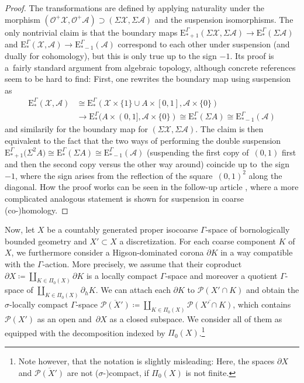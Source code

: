 \documentclass[pdftex]{sigma}
\numberwithin{equation}{section}
\theoremstyle{definition}
\newcommand{\cO}{\mathcal{O}}
\newcommand{\cP}{\mathcal{P}}
\newcommand{\cX}{\mathcal{X}}
\newcommand{\cA}{\mathcal{A}}
\newcommand{\Homol}{\mathrm{E}}
\newcommand{\coarsecomp}{\Pi_0}
\begin{document}
\begin{proof}
{\sloppy The transformations are defined by applying naturality under the morphism $(\cO^+\cX,\cO^+\cA)\allowbreak\supset (\Sigma\cX,\Sigma\cA)$ and the suspension isomorphisms. The only nontrivial claim is that the boundary maps $\Homol^\Gamma_{*+1}(\Sigma\cX,\Sigma\cA) \to \Homol^\Gamma_{*}(\Sigma\cA)$ and $\Homol^\Gamma_*(\cX,\cA) \to \Homol^\Gamma_{*-1}(\cA)$ correspond to each other under suspension (and dually for cohomology), but this is only true up to the sign $-1$. Its proof is a~fairly standard argument from algebraic topology, although concrete references seem to be hard to find: First, one rewrites the boundary map using suspension as
\begin{align*}
\Homol^\Gamma_*(\cX,\cA)&\cong \Homol^\Gamma_*(\cX\times\{1\}\cup A\times[0,1],\cA\times\{0\})
\\
&\to \Homol^\Gamma_*(A\times (0,1],\cA\times\{0\})\cong\Homol^\Gamma_*(\Sigma A)
\cong\Homol^\Gamma_{*-1}(\cA)
\end{align*}}\noindent
and similarily for the boundary map for $(\Sigma\cX,\Sigma\cA)$.
The claim is then equivalent to the fact that the two ways of performing the double suspension $\Homol^\Gamma_{*+1}\big(\Sigma^2 A\big) \cong\Homol^\Gamma_*(\Sigma A)\cong\Homol^\Gamma_{*-1}(\cA)$ (suspending the first copy of~$(0,1)$ first and then the second copy versus the other way around) coincide up to~the sign $-1$, where the sign arises from the reflection of the square~$(0,1)^2$ along the diagonal.
How the proof works can be seen in the follow-up article \cite[Lemma~4.6.3]{wulff2020secondary}, where a more complicated analogous statement is shown for suspension in coarse (co-)homology.
\end{proof}

Now, let $X$ be a countably generated proper isocoarse $\Gamma$-space of bornologically bounded geometry and $X'\subset X$ a discretization.
For each coarse component $K$ of $X$, we furthermore consider a Higson-dominated corona $\partial K$ in a way compatible with the $\Gamma$-action. More precisely, we assume that their coproduct $\partial X\coloneqq\coprod_{K\in\coarsecomp(X)}\partial K$ is a locally compact $\Gamma$-space and moreover a quotient $\Gamma$-space of $\coprod_{K\in\coarsecomp(X)}\partial_hK$. We can attach each $\partial K$ to $\cP(X'\cap K)$ and obtain the $\sigma$-locally compact $\Gamma$-space $\overline{\cP(X')}\coloneqq \coprod_{K\in\coarsecomp(X)}\overline{\cP(X'\cap K)}$, which contains $\cP(X')$ as an open and~$\partial X$ as a closed subspace.
We consider all of them as equipped with the decomposition indexed by $\coarsecomp(X)$.\footnote{Note however, that the notation is slightly misleading: Here, the spaces $\partial X$ and $\overline{\cP(X')}$ are not ($\sigma$-)compact, if $\coarsecomp(X)$ is not finite.}
\end{document}
